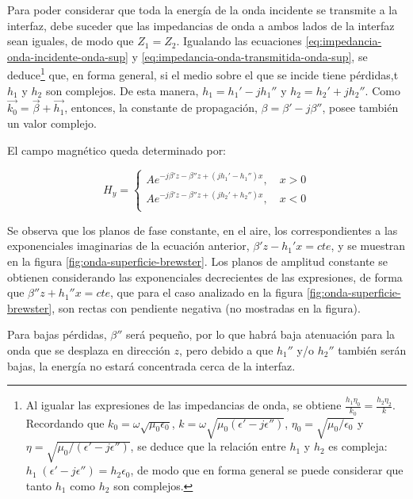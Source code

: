 Para poder considerar que toda la energía de la onda incidente se transmite a la interfaz, debe suceder que las impedancias de onda a ambos lados de la interfaz sean iguales, de modo que $Z_1 = Z_2$. Igualando las ecuaciones \ref{eq:impedancia-onda-incidente-onda-sup} y \ref{eq:impedancia-onda-transmitida-onda-sup}, se deduce\footnote{Al igualar las expresiones de las impedancias de onda, se obtiene $\frac{h_1 \eta_0}{k_0} = \frac{h_2 \eta_2}{k}$. Recordando que $k_0=\omega \sqrt{\mu_0 \epsilon_0}$, $k=\omega \sqrt{\mu_0 (\epsilon'-j\epsilon'')}$, $\eta_0 = \sqrt{\mu_0 / \epsilon_0}$ y $\eta = \sqrt{\mu_0 / (\epsilon'-j\epsilon'')}$, se deduce que la relación entre $h_1$ y $h_2$ es compleja: $h_1\; (\epsilon' - j \epsilon'') = h_2 \epsilon_0$, de modo que en forma general se puede considerar que tanto $h_1$ como $h_2$ son complejos.} que, en forma general, si el medio sobre el que se incide tiene pérdidas,t $h_1$ y $h_2$ son complejos. De esta manera, $h_1 = h_1' - jh_1''$ y $h_2 = h_2' + jh_2''$. Como $\vec{k_0} = \vec{\beta} + \vec{h_1}$, entonces, la constante de propagación, $\beta = \beta' - j \beta''$, posee también un valor complejo.

El campo magnético queda determinado por:

\begin{equation}
	H_y =
	\left\lbrace
	\begin{aligned}
		A e^{-j\beta'z -\beta''z + (j h_1' - h_1'')x}, \quad x>0 \\
		A e^{-j\beta'z -\beta''z + (j h_2' + h_2'')x}, \quad x<0 \\
	\end{aligned}
	\right.
\end{equation}

Se observa que los planos de fase constante, en el aire, los correspondientes a las exponenciales imaginarias de la ecuación anterior, $\beta'z - h_1'x = cte$, y se muestran en la figura \ref{fig:onda-superficie-brewster}. Los planos de amplitud constante se obtienen considerando las exponenciales decrecientes de las expresiones, de forma que $\beta''z + h_1''x = cte$, que para el caso analizado en la figura \ref{fig:onda-superficie-brewster}, son rectas con pendiente negativa (no mostradas en la figura).

Para bajas pérdidas, $\beta''$ será pequeño, por lo que habrá baja atenuación para la onda que se desplaza en dirección $z$, pero debido a que $h_1''$ y/o $h_2''$ también serán bajas, la energía no estará concentrada cerca de la interfaz.



